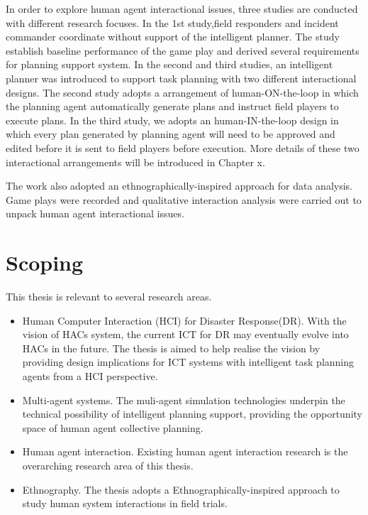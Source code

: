 In order to explore human agent interactional issues, three studies are conducted with different research focuses. In the 1st study,field responders and incident commander coordinate without support of the intelligent planner. The study establish baseline performance of the game play and derived several requirements for planning support system. In the second and third studies, an intelligent planner was introduced to support task planning with two different interactional designs. The second study adopts a arrangement of human-ON-the-loop in which the planning agent automatically generate plans and instruct field players to execute plans. In the third study, we adopts an human-IN-the-loop design in which every plan generated by planning agent will need to be approved and edited before it is sent to field players before execution. More details of these two interactional arrangements will be introduced in Chapter x.

The work also adopted an ethnographically-inspired approach for data analysis. Game plays were recorded and qualitative interaction analysis were carried out to unpack human agent interactional issues.\\


\section{Scoping}\label{sec:custom}

This thesis is relevant to several research areas. \\

\begin{itemize}
  
  \item Human Computer Interaction (HCI) for Disaster Response(DR). With the vision of HACs system, the current ICT for DR may eventually evolve into HACs in the future. The thesis is aimed to help realise the vision by providing design implications for ICT systems with intelligent task planning agents from a HCI perspective. 
  \item Multi-agent systems. The muli-agent simulation technologies underpin the technical possibility of intelligent planning support, providing the opportunity space of human agent collective planning. 
  \item Human agent interaction. Existing human agent interaction research is the overarching research area of this thesis. 
  \item Ethnography. The thesis adopts a Ethnographically-inspired approach to study human system interactions in field trials.
\end{itemize}

